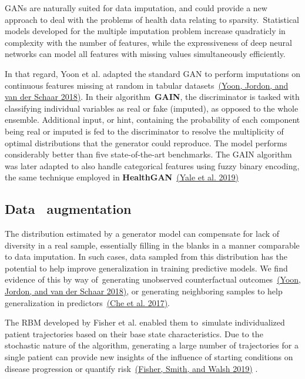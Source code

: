 \documentclass[10pt]{article}
\begin{document}
{\label{637664}}

GANs are naturally suited for data imputation, and could provide a new
approach to deal with the problems of health data relating to
sparsity.~Statistical models developed for the multiple imputation
problem increase quadraticly in complexity with the number of features,
while the expressiveness of deep neural networks can model all features
with missing values simultaneously efficiently.

In that regard, Yoon et al. adapted the standard GAN to perform
imputations on continuous features missing at random in tabular
datasets~\hyperref[csl:51]{(Yoon, Jordon, and van der Schaar 2018)}. In their algorithm~\textbf{GAIN}, the
discriminator is tasked with classifying individual variables as real or
fake (imputed), as opposed to the whole ensemble. Additional input, or
hint, containing the probability of each component being real or imputed
is fed to the discriminator to resolve the multiplicity of optimal
distributions that the generator could reproduce. The model performs
considerably better than five state-of-the-art benchmarks. The GAIN
algorithm was later adapted to also handle categorical features using
fuzzy binary encoding, the same technique employed in
\textbf{HealthGAN}~\hyperref[csl:35]{(Yale et al. 2019)}

\subsection{Data~ augmentation}

{\label{475996}}

The distribution estimated by a generator model can compensate for lack
of diversity in a real sample, essentially filling in the blanks in a
manner comparable to data imputation. In such cases, data sampled from
this distribution has the potential to help improve generalization in
training predictive models. We find evidence of this by way
of~generating unobserved counterfactual outcomes~\hyperref[csl:21]{(Yoon, Jordon, and van der Schaar 2018)}, or
generating neighboring samples to help generalization in
predictors~\hyperref[csl:15]{(Che et al. 2017)}.

The RBM developed by Fisher et al. enabled them to~simulate
individualized patient trajectories based on their base state
characteristics. Due to the stochastic nature of the algorithm,
generating a large number of trajectories for a single patient can
provide new insights of the influence of starting conditions on disease
progression or quantify risk~\hyperref[csl:10]{(Fisher, Smith, and Walsh 2019)} .
\end{document}
